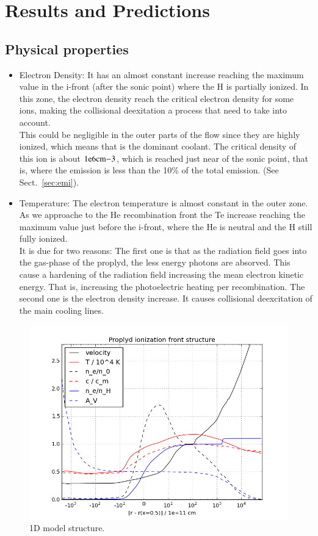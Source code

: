 \documentclass[aaspp]{article}
\begin{document}
\section{Results and Predictions}
\label{sec:results}



\subsection{Physical properties}
\label{sec:physical}

\begin{itemize}
  \item{Electron Density: It has an almost constant increase reaching the maximum value in the i-front (after the sonic point) where the H is partially ionized. In this zone, the electron density reach the critical electron density for some ions, making the collisional deexitation a process that need to take into account.\\ 
This could be negligible in the outer parts of the flow since they are highly ionized, which means that \oiii is the dominant coolant. The critical density of this ion is about $\rm 1e6 cm{-3}$, which is reached just near of the sonic point, that is, where the \oiii emission is less than the 10\% of the total \oiii emission. (See Sect.~\ref{sec:emi}).}
  \item{Temperature: The electron temperature is almost constant in the outer zone. As we approache to the He recombination front the Te increase reaching the maximum value just before the i-front, where the He is neutral and the H still fully ionized. \\
It is due for two reasons: The first one is that as the radiation field goes into the gas-phase of the proplyd, the less energy photons are absorved. This cause a hardening of the radiation field increasing the mean electron kinetic energy. That is, increasing the photoelectric heating per recombination. The second one is the electron density increase. It causes collisional deexcitation of the main cooling lines.}
\end{itemize}

\begin{figure}[h]
  \centering
  \includegraphics[width=8.5 cm]{ifrac-vs-Rlog.png}
  \caption{1D model structure.} \label{fig:ifrac}
\end{figure}
\end{document}
